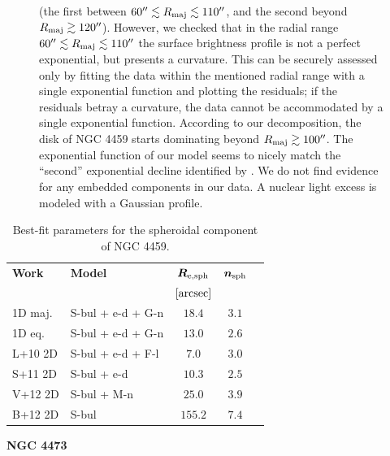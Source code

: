 \documentclass[preprint2]{emulateapj}
\begin{document}
\begin{figure}[h]
\begin{center}
{  (the first between $60'' \lesssim R_{\rm maj} \lesssim 110''$, and the second beyond $R_{\rm maj} \gtrsim 120''$). 
  However, we checked that in the radial range $60'' \lesssim R_{\rm maj} \lesssim 110''$ 
  the surface brightness profile is not a perfect exponential, but presents a curvature. 
  This can be securely assessed only by fitting the data within the mentioned radial range with a single exponential function 
  and plotting the residuals; 
  if the residuals betray a curvature, the data cannot be accommodated by a single exponential function. 
  According to our decomposition, the disk of NGC 4459 starts dominating beyond $R_{\rm maj} \gtrsim 100''$. 
  The exponential function of our model seems to nicely match the ``second'' exponential decline identified by \cite{gutierrez2011}.  
  We do not find evidence for any embedded components in our data.
  A nuclear light excess is modeled with a Gaussian profile.
  }
  \end{center}
  \end{figure}

  \begin{table}[h]
  \small
  \caption{Best-fit parameters for the spheroidal component of NGC 4459.}
  \begin{center}
  \begin{tabular}{llccc}
  \hline
  {\bf Work} & {\bf Model}   & $\bm R_{\rm e,sph}$    & $\bm n_{\rm sph}$ \\
    &  &  $[\rm arcsec]$ & \\
  \hline
  1D maj. & S-bul + e-d + G-n & $18.4$  &  $3.1$ \\
  1D eq.  & S-bul + e-d + G-n & $13.0$  &  $2.6$ \\
  \hline
  L+10 2D      & S-bul + e-d + F-l & $7.0$   &  $3.0$ \\
  S+11 2D      & S-bul + e-d	& $10.3$  &  $2.5$ \\
  V+12 2D      & S-bul + M-n	& $25.0$  &  $3.9$ \\
  B+12 2D      & S-bul		& $155.2$ &  $7.4$ \\
  \hline
  \end{tabular}
  \end{center}
  \label{tab:n4459}
  \end{table}




  \clearpage\newpage\noindent
  {\bf NGC 4473 \\}
\end{document}
